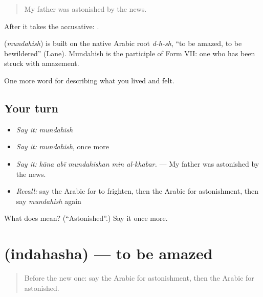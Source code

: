 \begin{quote}
My father was astonished by the news.
\end{quote}

After  it takes the accusative:  .

\begin{cousinweb}
\textbf{} (\emph{mundahish}) is built on the native Arabic root \emph{d-h-sh}, \textquotedblleft{}to be amazed, to be bewildered\textquotedblright{} (Lane). Mundahish is the participle of Form VII: one who has been struck with amazement.
\end{cousinweb}

\begin{grammarlens}[title={What you've built}]
One more word for describing what you lived and felt.
\end{grammarlens}

\subsection*{Your turn}
\begin{itemize}
\raggedright
  \item \emph{Say it:} \emph{mundahish}
  \item \emph{Say it:} \emph{mundahish}, once more
  \item \emph{Say it:} \emph{kāna abī mundahishan min al-khabar.} — My father was astonished by the news.
  \item \emph{Recall:} say the Arabic for to frighten, then the Arabic for astonishment, then say \emph{mundahish} again
\end{itemize}

\begin{tcolorbox}[breakable,colback=teal!4,colframe=teal!35!black,title={Before you move on}]
What does  mean? (\textquotedblleft{}Astonished\textquotedblright{}.) Say it once more.
\end{tcolorbox}
\section[\texorpdfstring{\ar{اندهش} (indahasha)}{اندهش (indahasha)}]{ (indahasha) — to be amazed}

\label{lesson:AR-C490-indahasha}



\begin{quote}
Before the new one: say the Arabic for astonishment, then the Arabic for astonished.
\end{quote}

